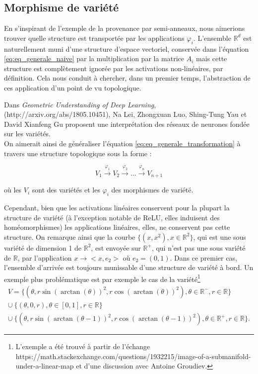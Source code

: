 \documentclass[11pt,a4paper]{article}
\newcommand{\R}{\ensuremath{\mathbb{R}}}
\begin{document}
\subsection{Morphisme de variété}

	En s'inspirant de l'exemple de la provenance par semi-anneaux, nous aimerions trouver quelle structure est transportée par les applications $\varphi_i$. L'ensemble $\R^d$ est naturellement muni d'une structure d'espace vectoriel, conservée dans l'équation \ref{eq:eq_generale_naive} par la multiplication par la matrice $A_i$ mais cette structure est complètement ignorée par les activations non-linéaires, par définition. Cela nous conduit à chercher, dans un premier temps, l'abstraction de ces application d'un point de vu topologique.

	Dans \textit{Geometric Understanding of Deep Learning}, (http://arxiv.org/abs/1805.10451), Na Lei, Zhongxuan Luo, Shing-Tung Yau et David Xianfeng Gu proposent une interprétation des réseaux de neurones fondée sur les variétés.
	\\
	
	
	On aimerait ainsi de généraliser l'équation \ref{eq:eq_generale_transformation} à travers une structure topologique sous la forme :
	
	\begin{equation}
	\label{eq:variete}
V_1 \overset{\varphi_1}{\to} V_2 \overset{\varphi_2}{\to} \dots \overset{\varphi_n}{\to} V_{n+1}	
	\end{equation}

où les $V_i$ sont des variétés et les $\varphi_i$ des morphismes de variété.

Cependant, bien que les activations linéaires conservent pour la plupart la structure de variété (à l'exception notable de ReLU, elles induisent des homéomorphismes) les applications linéaires, elles, ne conservent pas cette structure. On remarque ainsi que la courbe $\{ (x,x^2), x \in \R^2 \}$, qui est une sous variété de dimension 1 de $\R^2$, est envoyée sur $\R^+$, qui n'est pas une sous variété de $\R$, par l'application $x \to <x,e_2>$ où $e_2 = (0,1)$. Dans ce premier cas, l'ensemble d'arrivée est toujours munissable d'une structure de variété à bord. Un exemple plus problématique est par exemple le cas de la variété\footnote{L'exemple a été trouvé à partir de l'échange https://math.stackexchange.com/questions/1932215/image-of-a-submanifold-under-a-linear-map et d'une discussion avec Antoine Groudiev.}
\begin{equation}
\begin{array}{l}
V = \{(\theta,r\sin(\arctan (\theta))^2,r\cos(\arctan(\theta ))^2), \theta \in  \R^-, r \in \R \} \\
\cup \ \{(\theta,0,r), \theta \in [0,1], r \in \R \} \\
\cup \ \{(\theta,r\sin(\arctan (\theta - 1))^2,r\cos(\arctan(\theta - 1))^2), \theta \in  \R^+, r \in \R \}.
\end{array}
\end{equation}
\end{document}
